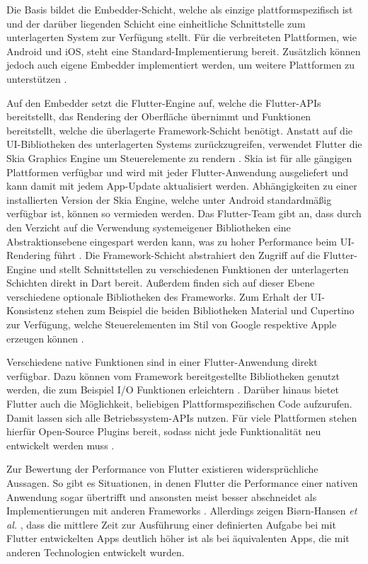 Die Basis bildet die Embedder-Schicht, welche als einzige plattformspezifisch ist und der darüber liegenden Schicht eine einheitliche Schnittstelle zum unterlagerten System zur Verfügung stellt.
Für die verbreiteten Plattformen, wie Android und iOS, steht eine Standard-Implementierung bereit.
Zusätzlich können jedoch auch eigene Embedder implementiert werden, um weitere Plattformen zu unterstützen \cite{Flutter_Architektur}.

Auf den Embedder setzt die Flutter-Engine auf, welche die Flutter-\acp{API} bereitstellt, das Rendering der Oberfläche übernimmt und Funktionen bereitstellt, welche die überlagerte Framework-Schicht benötigt.
Anstatt auf die \ac{UI}-Bibliotheken des unterlagerten Systems zurückzugreifen, verwendet Flutter die Skia Graphics Engine um Steuerelemente zu rendern \cite{Biorn-Hansen_PerformanceOverhead_CrossPlatform}.
Skia ist für alle gängigen Plattformen verfügbar und wird mit jeder Flutter-Anwendung ausgeliefert und kann damit mit jedem App-Update aktualisiert werden.
Abhängigkeiten zu einer installierten Version der Skia Engine, welche unter Android standardmäßig verfügbar ist, können so vermieden werden.
Das Flutter-Team gibt an, dass durch den Verzicht auf die Verwendung systemeigener Bibliotheken eine Abstraktionsebene eingespart werden kann, was zu hoher Performance beim \ac{UI}-Rendering führt \cite{Flutter_Architektur}.
Die Framework-Schicht abstrahiert den Zugriff auf die Flutter-Engine und stellt Schnittstellen zu verschiedenen Funktionen der unterlagerten Schichten direkt in Dart bereit.
Außerdem finden sich auf dieser Ebene verschiedene optionale Bibliotheken des Frameworks.
Zum Erhalt der \ac{UI}-Konsistenz stehen zum Beispiel die beiden Bibliotheken Material und Cupertino zur Verfügung, welche Steuerelementen im Stil von Google respektive Apple erzeugen können \cite{Manchanda_CrossPlatformFrameworks, Flutter_Architektur}.


Verschiedene native Funktionen sind in einer Flutter-Anwendung direkt verfügbar.
Dazu können vom Framework bereitgestellte Bibliotheken genutzt werden, die zum Beispiel \ac{I/O} Funktionen erleichtern \cite{Dart_Overview}.
Darüber hinaus bietet Flutter auch die Möglichkeit, beliebigen Plattformspezifischen Code aufzurufen.
Damit lassen sich alle Betriebssystem-\acp{API} nutzen.
Für viele Plattformen stehen hierfür Open-Source Plugins bereit, sodass nicht jede Funktionalität neu entwickelt werden muss \cite{Flutter_Architektur}.


Zur Bewertung der Performance von Flutter existieren widersprüchliche Aussagen.
So gibt es Situationen, in denen Flutter die Performance einer nativen Anwendung sogar übertrifft und ansonsten meist besser abschneidet als Implementierungen mit anderen Frameworks \cite{Nawrocki_Comparison_Hybrid_Native_Frameworks}.
Allerdings zeigen Bi{\o}rn-Hansen \textit{et al.} \cite{Biorn-Hansen_PerformanceOverhead_CrossPlatform}, dass die mittlere Zeit zur Ausführung einer definierten Aufgabe bei mit Flutter entwickelten Apps deutlich höher ist als bei äquivalenten Apps, die mit anderen Technologien entwickelt wurden.

